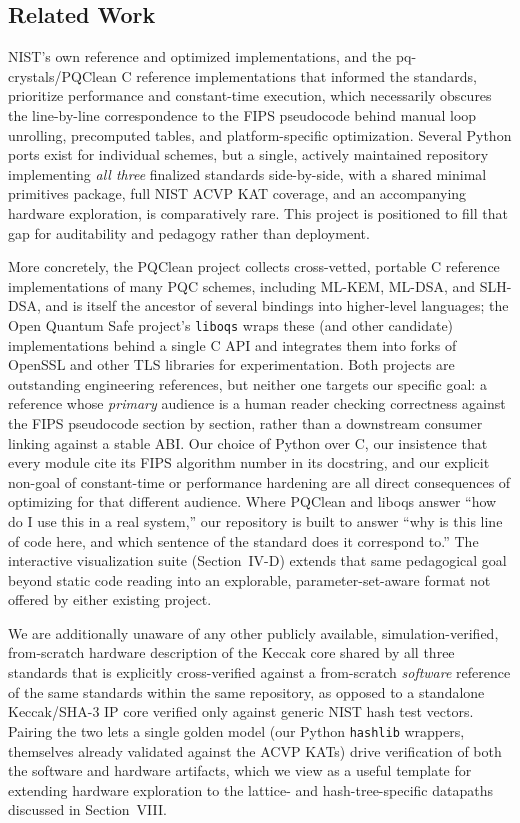 \documentclass[10pt,conference]{IEEEtran}
\begin{document}
\subsection{Related Work}

NIST's own reference and optimized implementations, and the
pq-crystals/PQClean C reference implementations that informed the
standards, prioritize performance and constant-time execution, which
necessarily obscures the line-by-line correspondence to the FIPS
pseudocode behind manual loop unrolling, precomputed tables, and
platform-specific optimization. Several Python ports exist for individual
schemes, but a single, actively maintained repository implementing
\emph{all three} finalized standards side-by-side, with a shared minimal
primitives package, full NIST ACVP KAT coverage, and an accompanying
hardware exploration, is comparatively rare. This project is positioned
to fill that gap for auditability and pedagogy rather than deployment.

More concretely, the PQClean project \cite{pqclean} collects
cross-vetted, portable C reference implementations of many PQC schemes,
including ML-KEM, ML-DSA, and SLH-DSA, and is itself the ancestor of
several bindings into higher-level languages; the Open Quantum Safe
project's \texttt{liboqs} \cite{liboqs} wraps these (and other candidate)
implementations behind a single C API and integrates them into forks of
OpenSSL and other TLS libraries for experimentation. Both projects are
outstanding engineering references, but neither one targets our specific
goal: a reference whose \emph{primary} audience is a human reader
checking correctness against the FIPS pseudocode section by section,
rather than a downstream consumer linking against a stable ABI. Our
choice of Python over C, our insistence that every module cite its FIPS
algorithm number in its docstring, and our explicit non-goal of
constant-time or performance hardening are all direct consequences of
optimizing for that different audience. Where PQClean and liboqs answer
``how do I use this in a real system,'' our repository is built to
answer ``why is this line of code here, and which sentence of the
standard does it correspond to.'' The interactive visualization suite
(Section~IV-D) extends that same pedagogical goal beyond static code
reading into an explorable, parameter-set-aware format not offered by
either existing project.

We are additionally unaware of any other publicly available,
simulation-verified, from-scratch hardware description of the Keccak
core shared by all three standards that is explicitly cross-verified
against a from-scratch \emph{software} reference of the same standards
within the same repository, as opposed to a standalone Keccak/SHA-3 IP
core verified only against generic NIST hash test vectors. Pairing the
two lets a single golden model (our Python \texttt{hashlib} wrappers,
themselves already validated against the ACVP KATs) drive verification
of both the software and hardware artifacts, which we view as a useful
template for extending hardware exploration to the lattice- and
hash-tree-specific datapaths discussed in Section~VIII.
\end{document}
